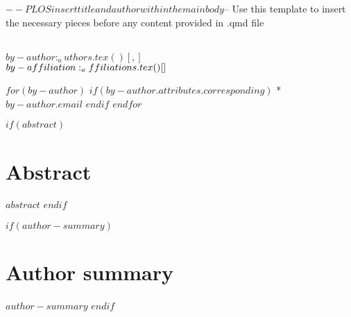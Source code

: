 $-- PLOS insert title and author within the main body
$-- Use this template to insert the necessary pieces before any content provided in .qmd file
\vspace*{0.2in}

\begin{flushleft}
{\Large
\textbf{} %
}
\newline
\\
$by-author:_authors.tex()[, ]$
\\
\bigskip
$by-affiliation:_affiliations.tex()[\\ ]$
\bigskip


$for(by-author)$
$if(by-author.attributes.corresponding)$
* $by-author.email$
$endif$
$endfor$

\end{flushleft}

$if(abstract)$
\section*{Abstract}
$abstract$
$endif$

$if(author-summary)$
\section*{Author summary}
$author-summary$
$endif$

\linenumbers
